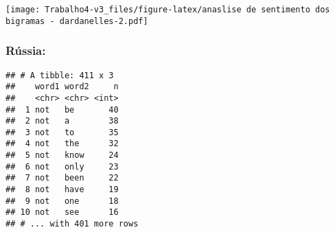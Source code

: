 \documentclass[]{article}
\newenvironment{Shaded}{\begin{snugshade}}{\end{snugshade}}
\newcommand{\DataTypeTok}[1]{\textcolor[rgb]{0.13,0.29,0.53}{#1}}
\newcommand{\KeywordTok}[1]{\textcolor[rgb]{0.13,0.29,0.53}{\textbf{#1}}}
\newcommand{\NormalTok}[1]{#1}
\newcommand{\OperatorTok}[1]{\textcolor[rgb]{0.81,0.36,0.00}{\textbf{#1}}}
\newcommand{\OtherTok}[1]{\textcolor[rgb]{0.56,0.35,0.01}{#1}}
\newcommand{\StringTok}[1]{\textcolor[rgb]{0.31,0.60,0.02}{#1}}
\begin{document}
\texttt{[image: Trabalho4-v3\_files/figure-latex/anaslise de sentimento dos bigramas - dardanelles-2.pdf]}

\hypertarget{russia-4}{%
\subsubsection{Rússia:}\label{russia-4}}

\begin{Shaded}
\end{Shaded}

\begin{verbatim}
## # A tibble: 411 x 3
##    word1 word2     n
##    <chr> <chr> <int>
##  1 not   be       40
##  2 not   a        38
##  3 not   to       35
##  4 not   the      32
##  5 not   know     24
##  6 not   only     23
##  7 not   been     22
##  8 not   have     19
##  9 not   one      18
## 10 not   see      16
## # ... with 401 more rows
\end{verbatim}
\end{document}
